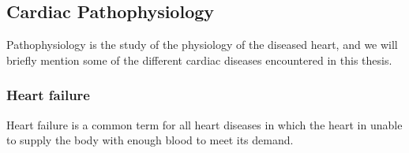 



\subsection{Cardiac Pathophysiology}
Pathophysiology is the study of the physiology of the diseased heart,
and we will briefly mention some of the different cardiac diseases
encountered in this thesis. 


\subsubsection{Heart failure}
Heart failure is a common term for all heart diseases in which the
heart in unable to supply the body with enough blood to meet its demand.

